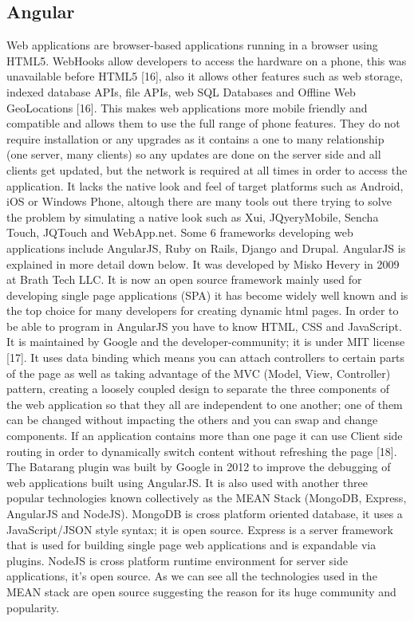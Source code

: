 \subsection{Angular}
\bigbreak
Web applications are browser-based applications running in a browser
using HTML5. WebHooks allow developers to access the hardware on a
phone, this was unavailable before HTML5 [16], also it allows other features
such as web storage, indexed database APIs, file APIs, web SQL Databases and
Offline Web GeoLocations [16]. This makes web applications more mobile
friendly and compatible and allows them to use the full range of phone
features. They do not require installation or any upgrades as it contains a one
to many relationship (one server, many clients) so any updates are done on
the server side and all clients get updated, but the network is required at all
times in order to access the application. It lacks the native look and feel of
target platforms such as Android, iOS or Windows Phone, altough there are
many tools out there trying to solve the problem by simulating a native look
such as Xui, JQyeryMobile, Sencha Touch, JQTouch and WebApp.net. Some
6
frameworks developing web applications include AngularJS, Ruby on Rails,
Django and Drupal. AngularJS is explained in more detail down below.
\bigbreak
It was developed by Misko Hevery in 2009 at Brath Tech LLC. It is now an
open source framework mainly used for developing single page applications
(SPA) it has become widely well known and is the top choice for many
developers for creating dynamic html pages. In order to be able to program
in AngularJS you have to know HTML, CSS and JavaScript. It is maintained by
Google and the developer-community; it is under MIT license [17]. It uses
data binding which means you can attach controllers to certain parts of the
page as well as taking advantage of the MVC (Model, View, Controller)
pattern, creating a loosely coupled design to separate the three components
of the web application so that they all are independent to one another; one of
them can be changed without impacting the others and you can swap and
change components. If an application contains more than one page it can use
Client side routing in order to dynamically switch content without refreshing
the page [18]. The Batarang plugin was built by Google in 2012 to improve
the debugging of web applications built using AngularJS. It is also used with
another three popular technologies known collectively as the MEAN Stack
(MongoDB, Express, AngularJS and NodeJS). MongoDB is cross platform
oriented database, it uses a JavaScript/JSON style syntax; it is open source.
Express is a server framework that is used for building single page web
applications and is expandable via plugins. NodeJS is cross platform runtime
environment for server side applications, it’s open source. As we can see all
the technologies used in the MEAN stack are open source suggesting the
reason for its huge community and popularity.

